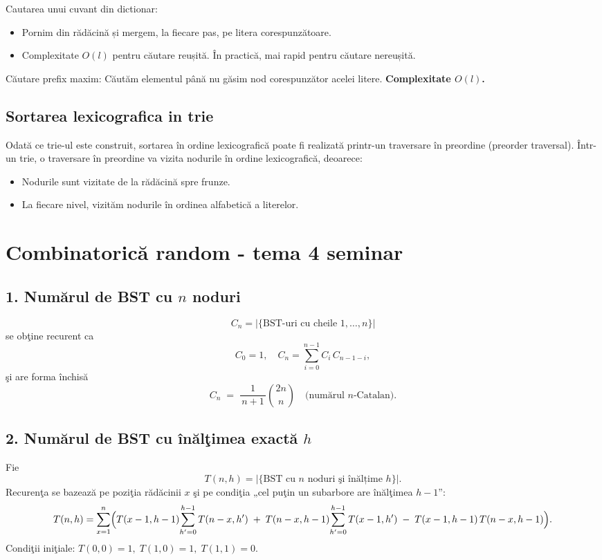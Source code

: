\documentclass[11pt,a4paper]{article}
\theoremstyle{definition}
\theoremstyle{plain}
\theoremstyle{remark}
\begin{document}
Cautarea unui cuvant din dictionar:
\begin{itemize}
    \item Pornim din rădăcină și mergem, la ﬁecare pas, pe litera corespunzătoare.
    \item Complexitate $O(l)$ pentru căutare reușită.
    În practică, mai rapid pentru căutare nereușită.
\end{itemize}

Căutare preﬁx maxim: Căutăm elementul până nu găsim nod corespunzător acelei litere. \textbf{Complexitate $O(l)$.}

\subsection*{Sortarea lexicografica in trie}
Odată ce trie-ul este construit, sortarea în ordine lexicografică poate fi realizată printr-un traversare în preordine (preorder traversal). Într-un trie, o traversare în preordine va vizita nodurile în ordine lexicografică, deoarece:

\begin{itemize}
    \item Nodurile sunt vizitate de la rădăcină spre frunze.
    \item La fiecare nivel, vizităm nodurile în ordinea alfabetică a literelor.
\end{itemize}

\section{Combinatorică random - tema 4 seminar}

\subsection*{1. Numărul de BST cu \(n\) noduri}
\[
  C_n = \bigl|\{\text{BST-uri cu cheile }1,\dots,n\}\bigr|
\]
se obţine recurent ca
\[
  C_0 = 1,\quad
  C_n = \sum_{i=0}^{n-1} C_i\,C_{n-1-i},
\]
şi are forma închisă
\[
  C_n \;=\; \frac1{\,n+1\,}\binom{2n}{n}\quad\text{(numărul \(n\)-\(\)Catalan).}
\]

\subsection*{2. Numărul de BST cu înălţimea exactă \(h\)}
Fie
\[
  T(n,h)=\bigl|\{\text{BST cu \(n\) noduri şi înălțime }h\}\bigr|.
\]
Recurenţa se bazează pe poziţia rădăcinii \(x\) şi pe condiţia „cel puţin un subarbore are înălţimea \(h-1\)”:
\[
  T(n,h)
  = \sum_{x=1}^n\Bigl(
    T(x-1,h-1)\!\sum_{h'=0}^{h-1}T(n-x,h')
    \;+\;
    T(n-x,h-1)\!\sum_{h'=0}^{h-1}T(x-1,h')
    \;-\;
    T(x-1,h-1)\,T(n-x,h-1)\Bigr).
\]
Condiţii iniţiale: \(T(0,0)=1,\;T(1,0)=1,\;T(1,1)=0\).
\end{document}

